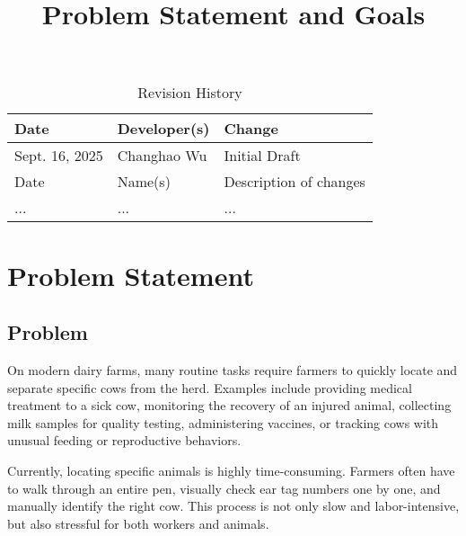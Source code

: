 \documentclass{article}
\title{Problem Statement and Goals\\\progname}
\author{\authname}
\date{}
\begin{document}
\maketitle

\begin{table}[hp]
    \caption{Revision History} \label{TblRevisionHistory}
        \begin{tabularx}{\textwidth}{llX}
        \toprule
        \textbf{Date} & \textbf{Developer(s)} & \textbf{Change}\\
        \midrule
            Sept. 16, 2025  & Changhao Wu           & Initial Draft         \\
            Date            & Name(s)               & Description of changes\\
            ...             & ...                   & ...                   \\
        \bottomrule
        \end{tabularx}
\end{table}

\section{Problem Statement}




\subsection{Problem}

    On modern dairy farms, many routine tasks require farmers to quickly locate and 
    separate specific cows from the herd. Examples include providing medical treatment 
    to a sick cow, monitoring the recovery of an injured animal, collecting milk samples 
    for quality testing, administering vaccines, or tracking cows with unusual feeding 
    or reproductive behaviors.  

    \setlength{\parskip}{0.6em} 

    Currently, locating specific animals is highly time-consuming. Farmers often 
    have to walk through an entire pen, visually check ear tag numbers one by one, 
    and manually identify the right cow. This process is not only slow and 
    labor-intensive, but also stressful for both workers and animals.
\end{document}

